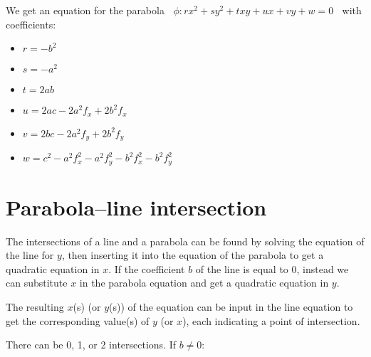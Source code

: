 \documentclass[11pt,a4paper,english]{article}
\begin{document}
	We get an equation for the parabola \(\;\;
		\phi : rx^{2} + sy^{2} + txy + ux + vy + w = 0
	\;\;\)
	with coefficients:

	\begin{itemize}[label=\(\triangleright\)]\setlength{\itemsep}{-2pt}
    \item \(r = -b^{2}\)
    \item \(s = -a^{2}\)
    \item \(t = 2ab\)
    \item \(u = 2ac-2a^{2}f_{x} + 2b^{2}f_{x}\)
    \item \(v = 2bc-2a^{2}f_{y} + 2b^{2}f_{y}\)
    \item \(w = c^{2} - a^{2}f_{x}^{2} - a^{2}f_{y}^{2} - b^{2}f_{x}^{2} - b^{2}f_{y}^{2}\)
    \end{itemize}
    
    \newpage
    
    \section*{Parabola--line intersection}
    The intersections of a line and a parabola can be found by solving the equation of the line for \(y\), then inserting it into the equation of the parabola to get a quadratic equation in \(x\). If the coefficient \(b\) of the line is equal to 0, instead we can substitute \(x\) in the parabola equation and get a quadratic equation in \(y\).\par
    The resulting \(x\)(s) (or \(y\)(s)) of the equation can be input in the line equation to get the corresponding value(s) of \(y\) (or \(x\)), each indicating a point of intersection.\par
    There can be 0, 1, or 2 intersections.
    \ppar
    If \(b \neq 0\):
    
\end{document}

